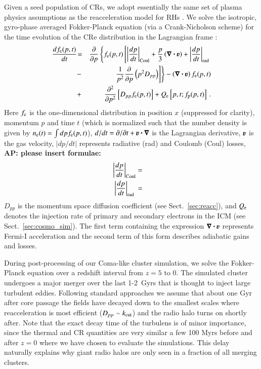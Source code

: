 \documentclass[fleqn,usenatbib,useAMS]{mnras}
\newcommand{\bcdot}{\ensuremath{%
  \mathchoice%
   {\mskip\thinmuskip\lower0.2ex\hbox{\scalebox{1.5}{$\cdot$}}\mskip\thinmuskip}}%
   {\mskip\thinmuskip\lower0.2ex\hbox{\scalebox{1.5}{$\cdot$}}\mskip\thinmuskip}%
   {\lower0.3ex\hbox{\scalebox{1.2}{$\cdot$}}}%
   {\lower0.3ex\hbox{\scalebox{1.2}{$\cdot$}}}%
}
\newcommand{\bvel}{\ensuremath{\boldsymbol{\varv}}}
\newcommand{\bnabla}{\ensuremath{\boldsymbol{\nabla}}}
\def\AP2#1{{\bf  AP2: #1}}
\def\AP#1{{\bf {\color{blue} AP: #1}}}
\begin{document}
Given a seed population of CRs, we adopt essentially the same set of
plasma physics assumptions as the reacceleration model for RHs
\citep{brunetti07,brunetti11}. We solve the isotropic, gyro-phase
averaged Fokker-Planck equation (via a Crank-Nicholson scheme) for the
time evolution of the CRe distribution in the Lagrangian frame
\citep{brunetti07,brunetti11}:
\begin{eqnarray}
{{d f_{\rmn{e}}(p,t)}\over{d t}} &\!=&
\frac{\partial}{\partial p}
\left\{
f_{\rmn{e}}(p,t)\left[
\left|\frac{dp}{dt}\right|_{\rm Coul} 
+ \frac{p}{3}\left(\bnabla\bcdot \bvel\right)
+ \left|\frac{dp}{dt}\right|_{\rm rad}\right.\right.
\nonumber\\
&-& \left.\left.{1\over{p^2}}{{\partial }\over{\partial p}}\left(p^2 D_{pp}\right) 
\right]\right\} - \left(\bnabla\bcdot \bvel\right) f_{\rmn{e}}(p,t)
\nonumber\\
&+& {{\partial^2 }\over{\partial p^2}}
\left[
D_{pp} f_{\rmn{e}}(p,t) \right]+ Q_{\rmn{e}}\left[p,t;f_{\rmn{p}}(p,t)\right]   \, .
\label{elettroni}
\end{eqnarray}
Here $f_{{\mathrm{e}}}$ is the one-dimensional distribution in position $x$
(suppressed for clarity), momentum $p$ and time $t$ (which is
normalized such that the number density is given by
$n_{{\mathrm{e}}}(t)=\int d p f_{{\mathrm{e}}}(p,t)$), $d/dt=\partial/\partial
t+\bvel\bcdot\bnabla$ is the Lagrangian derivative, $\bvel$ is the gas
velocity, $|dp/dt|$ represents radiative (rad) and Coulomb (Coul)
losses, \AP{please insert formulae:}
\begin{eqnarray}
  \left|\frac{dp}{dt}\right|_{\rm Coul}
  &=& \\
  \left|\frac{dp}{dt}\right|_{\rm rad~}
  &=& 
\end{eqnarray}
$D_{pp}$ is the momentum space diffusion coefficient (see
Sect.~\ref{sec:reacc}), and $Q_{{\mathrm{e}}}$ denotes the injection rate
of primary and secondary electrons in the ICM (see
Sect.~\ref{sec:cosmo_sim}). The first term containing the expression
$\bnabla\bcdot \bvel$ represents Fermi-I acceleration and the second
term of this form describes adiabatic gains and losses.

During post-processing of our Coma-like cluster simulation, we solve
the Fokker-Planck equation over a redshift interval from $z=5$ to
0. The simulated cluster undergoes a major merger over the last
1-2~Gyrs that is thought to inject large turbulent eddies. Following
standard approaches
\citep{brunetti07,brunetti11,2004ApJ...614..757Y,2015ApJ...800...60M}
we assume that about one Gyr after core passage the fields have
decayed down to the smallest scales where reacceleration is most
efficient ($D_{pp}\sim k_{\mathrm{cut}}$) and the radio halo turns on
shortly after. Note that the exact decay time of the turbulens is of
minor importance, since the thermal and CR quantities are very similar
a few 100 Myrs before and after $z=0$ where we have chosen to evaluate
the simulations. This delay naturally explains why giant radio halos
are only seen in a fraction of all merging clusters.
\end{document}
